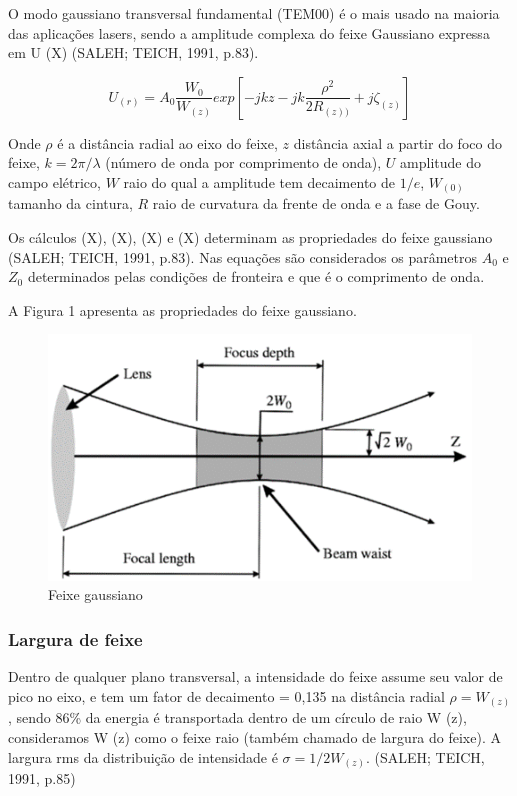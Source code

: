 \documentclass{fei}
\begin{document}
O modo gaussiano transversal fundamental (TEM00) é o mais usado na maioria das aplicações lasers, sendo a amplitude complexa do feixe Gaussiano expressa em U (X) (SALEH; TEICH, 1991, p.83).

\begin{equation}
\label{eq:gaussiano}
U_{(r)}=A_0\frac{W_0}{W_{(z)}}exp\left [ -jkz-jk\frac{\rho ^2}{2R_{(z))}}+j\zeta_{(z)} \right ]
\end{equation}

Onde $\rho$ é a distância radial ao eixo do feixe, $z$ distância axial a partir do foco do feixe, $k = 2\pi/\lambda$ (número de onda por comprimento de onda), $U$ amplitude do campo elétrico, $W$ raio do qual a amplitude tem decaimento de $1/e$, $W_{(0)}$ tamanho da cintura, $R$ raio de curvatura da frente de onda e a fase de Gouy.

Os cálculos (X), (X), (X) e (X) determinam as propriedades do feixe gaussiano (SALEH; TEICH, 1991, p.83). Nas equações são considerados os parâmetros $A_0$ e $Z_0$ determinados pelas condições de fronteira e   que é o comprimento de onda.

A Figura 1 apresenta as propriedades do feixe gaussiano.

\begin{figure}
\centering
\label{feixe_gaussiano}
\caption{Feixe gaussiano}
\includegraphics{feixe_gaussiano}
\end{figure}

\subsubsection{Largura de feixe}

Dentro de qualquer plano transversal, a intensidade do feixe assume seu valor de pico no eixo, e tem um fator de decaimento = 0,135 na distância radial $\rho = W_{(z)}$, sendo 86\% da energia é transportada dentro de um círculo de raio W (z), consideramos W (z) como o feixe raio (também chamado de largura do feixe). A largura rms da distribuição de intensidade é $\sigma = 1/2W_{(z)}$. (SALEH; TEICH, 1991, p.85)
\end{document}
